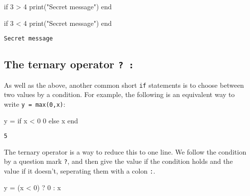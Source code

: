 \documentclass[
  letterpaper,
  DIV=11,
  numbers=noendperiod]{scrreprt}
\newenvironment{Shaded}{\begin{snugshade}}{\end{snugshade}}
\newcommand{\ControlFlowTok}[1]{\textcolor[rgb]{0.00,0.23,0.31}{#1}}
\newcommand{\FloatTok}[1]{\textcolor[rgb]{0.68,0.00,0.00}{#1}}
\newcommand{\FunctionTok}[1]{\textcolor[rgb]{0.28,0.35,0.67}{#1}}
\newcommand{\NormalTok}[1]{\textcolor[rgb]{0.00,0.23,0.31}{#1}}
\newcommand{\OperatorTok}[1]{\textcolor[rgb]{0.37,0.37,0.37}{#1}}
\newcommand{\StringTok}[1]{\textcolor[rgb]{0.13,0.47,0.30}{#1}}
\begin{document}
\begin{Shaded}
\begin{Highlighting}[]
\ControlFlowTok{if} \FloatTok{3} \OperatorTok{\textgreater{}} \FloatTok{4}
    \FunctionTok{print}\NormalTok{(}\StringTok{"Secret message"}\NormalTok{)}
\ControlFlowTok{end}
\end{Highlighting}
\end{Shaded}

\begin{Shaded}
\begin{Highlighting}[]
\ControlFlowTok{if} \FloatTok{3} \OperatorTok{\textless{}} \FloatTok{4}
    \FunctionTok{print}\NormalTok{(}\StringTok{"Secret message"}\NormalTok{)}
\ControlFlowTok{end}
\end{Highlighting}
\end{Shaded}

\begin{verbatim}
Secret message
\end{verbatim}

\hypertarget{the-ternary-operator}{%
\subsection{\texorpdfstring{The ternary operator
\texttt{?\ :}}{The ternary operator ? :}}\label{the-ternary-operator}}

As well as the above, another common short \texttt{if} statements is to
choose between two values by a condition. For example, the following is
an equivalent way to write \texttt{y\ =\ max(0,x)}:

\begin{Shaded}
\begin{Highlighting}[]
\NormalTok{y }\OperatorTok{=} \ControlFlowTok{if}\NormalTok{ x }\OperatorTok{\textless{}} \FloatTok{0}
    \FloatTok{0}
\ControlFlowTok{else}
\NormalTok{    x}
\ControlFlowTok{end}
\end{Highlighting}
\end{Shaded}

\begin{verbatim}
5
\end{verbatim}

The ternary operator is a way to reduce this to one line. We follow the
condition by a question mark \texttt{?}, and then give the value if the
condition holds and the value if it doesn't, seperating them with a
colon \texttt{:}.

\begin{Shaded}
\begin{Highlighting}[]
\NormalTok{y }\OperatorTok{=}\NormalTok{ (x }\OperatorTok{\textless{}} \FloatTok{0}\NormalTok{) ? }\FloatTok{0} \OperatorTok{:}\NormalTok{ x}
\end{Highlighting}
\end{Shaded}
\end{document}
